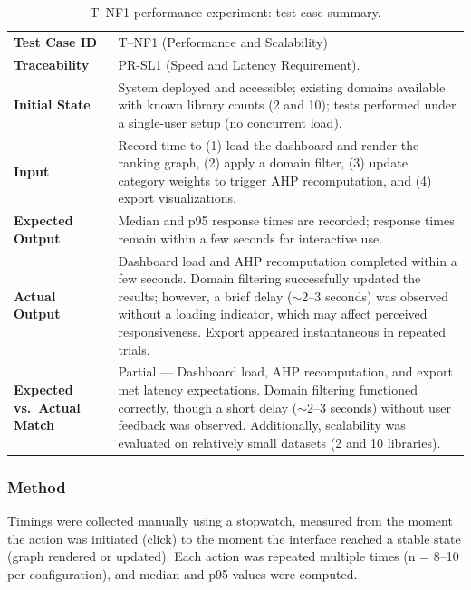 \documentclass[12pt, titlepage]{article}
\begin{document}
\begin{table}[H]
  \centering
  \caption{T--NF1 performance experiment: test case summary.}
  \label{tab:tnf1-summary}
  \begin{tabular}{@{}p{}p{}@{}}
    \toprule
    \textbf{Test Case ID} &
      T--NF1 (Performance and Scalability) \\
    \textbf{Traceability} &
      PR-SL1 (Speed and Latency Requirement). \\
    \textbf{Initial State} &
      System deployed and accessible; existing domains available with known
library counts (2 and 10); tests performed under a single-user setup (no concurrent load). \\
    \textbf{Input} &
      Record time to (1) load the dashboard and render the ranking graph,
      (2) apply a domain filter, (3) update category weights to trigger AHP
      recomputation, and (4) export visualizations. \\
    \textbf{Expected Output} &
      Median and p95 response times are recorded; response times remain within
      a few seconds for interactive use. \\
    \textbf{Actual Output} &
      Dashboard load and AHP recomputation completed within a few seconds.
      Domain filtering successfully updated the results; however, a brief delay
      ($\sim$2--3 seconds) was observed without a loading indicator, which may
      affect perceived responsiveness. Export appeared instantaneous in repeated
      trials. \\
    \textbf{Expected vs.\ Actual Match} &
      Partial --- Dashboard load, AHP recomputation, and export met latency
      expectations. Domain filtering functioned correctly, though a short delay
      ($\sim$2--3 seconds) without user feedback was observed. Additionally,
      scalability was evaluated on relatively small datasets (2 and 10
      libraries). \\
    \bottomrule
  \end{tabular}
\end{table}

\subsubsection{Method}
Timings were collected manually using a stopwatch, measured from the moment
the action was initiated (click) to the moment the interface reached a stable
state (graph rendered or updated). Each action was repeated multiple times
(n = 8--10 per configuration), and median and p95 values were computed.
\end{document}
